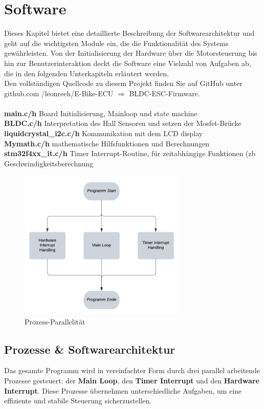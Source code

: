 \documentclass[paper=a4,11pt]{scrreprt}
\begin{document}
\chapter{Software}
Dieses Kapitel bietet eine detaillierte Beschreibung der Softwarearchitektur und geht auf die wichtigsten Module ein, die die Funktionalität des Systems gewährleisten. Von der Initialisierung der Hardware über die Motorsteuerung bis hin zur Benutzerinteraktion deckt die Software eine Vielzahl von Aufgaben ab, die in den folgenden Unterkapiteln erläutert werden.\\
Den vollständigen Quellcode zu diesem Projekt finden Sie auf GitHub unter github.com
/leonreeh/E-Bike-ECU $\Rightarrow$ BLDC-ESC-Firmware.\\
\\
\textbf{main.c/h }Board Initialisierung, Mainloop und state machine\\
\textbf{BLDC.c/h}  Interpretation des Hall Sensoren und setzen der Mosfet-Brücke\\
\textbf{liquidcrystal\_i2c.c/h} Kommunikation mit dem LCD display\\
\textbf{Mymath.c/h} mathematische Hilfsfunktionen und Berechnungen\\
\textbf{stm32f4xx\_it.c/h} Timer Interrupt-Routine, für zeitabhängige Funktionen (zb Geschwindigkeitsberechnung\\
\begin{figure}[ht]
\begin{center}
\includegraphics[width=8cm]{Bilder/Concurency.PNG}
\caption{Prozess-Parallelität}
\label{concur}
\end{center}
\end{figure}
\newpage
\section{Prozesse \& Softwarearchitektur}
Das gesamte Programm wird in vereinfachter Form durch drei parallel arbeitende Prozesse gesteuert: der \textbf{Main Loop}, den \textbf{Timer Interrupt} und den \textbf{Hardware Interrupt}. Diese Prozesse übernehmen unterschiedliche Aufgaben, um eine effiziente und stabile Steuerung sicherzustellen.\\
\end{document}
